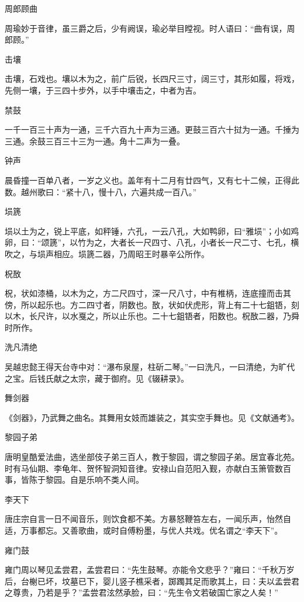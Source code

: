 \documentclass[a4paper,12pt,UTF8,twoside]{ctexbook}
\begin{document}
    周郎顾曲
    
    周瑜妙于音律，虽三爵之后，少有阙误，瑜必举目瞠视。时人语曰：“曲有误，周郎顾。”
    
    击壤
    
    击壤，石戏也。壤以木为之，前广后锐，长四尺三寸，阔三寸，其形如履，将戏，先侧一壤，于三四十步外，以手中壤击之，中者为吉。
    
    禁鼓
    
    一千一百三十声为一通，三千六百九十声为三通。更鼓三百六十挝为一通。千捶为三通。余鼓三百三十三为一通。角十二声为一叠。
    
    钟声
    
    晨昏撞一百单八者，一岁之义也。盖年有十二月有廿四气，又有七十二候，正得此数。越州歌曰：“紧十八，慢十八，六遍共成一百八。”
    
    埙篪
    
    埙以土为之，锐上平底，如秤锤，六孔，一云八孔，大如鸭卵，曰“雅埙”；小如鸡卵，曰：“颂篪”，以竹为之，大者长一尺四寸、八孔，小者长一尺二寸、七孔，横吹之，与埙声相应。埙篪二器，乃周昭王时暴辛公所作。
    
    柷敔
    
    柷，状如漆桶，以木为之，方二尺四寸，深一尺八寸，中有椎柄，连底撞而击其傍，所以起乐也。方二四寸者，阴数也。敔，状如伏虎形，背上有二十七鉏铻，刻以木，长尺许，以水戛之，所以止乐也。二十七鉏铻者，阳数也。柷敔二器，乃舜时所作。
    
    洗凡清绝
    
    吴越忠懿王得天台寺中对：“瀑布泉屋，柱斫二琴。”一曰洗凡，一曰清绝，为旷代之宝。后钱氏献之太宗，藏于御府。见《辍耕录》。
    
    舞剑器
    
    《剑器》，乃武舞之曲名。其舞用女妓而雄装之，其实空手舞也。见《文献通考》。
    
    黎园子弟
    
    唐明皇酷爱法曲，选坐部伎子弟三百人，教于黎园，谓之黎园子弟。居宜春北苑。时有马仙期、李龟年、贺怀智洞知音律。安禄山自范阳入觐，亦献白玉箫管数百事，皆陈于黎园。自是乐响不类人间。
    
    李天下
    
    唐庄宗自言一日不闻音乐，则饮食都不美。方暴怒鞭笞左右，一闻乐声，怡然自适，万事都忘。又善歌曲，或时自傅粉墨，与优人共戏。优名谓之“李天下”。
    
    雍门鼓
    
    雍门周以琴见孟尝君，孟尝君曰：“先生鼓琴。亦能令文悲乎？”雍曰：“千秋万岁后，台榭已坏，坟墓已下，婴儿竖子樵采者，踯躅其足而歌其上，曰：夫以孟尝君之尊贵，乃若是乎？”孟尝君泫然承脸，曰：“先生令文若破国亡家之人矣！”
    
\end{document}
